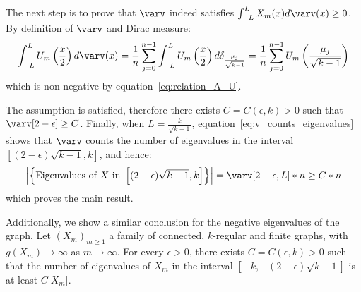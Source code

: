 \documentclass[11pt]{article}
\theoremstyle{definition}
\begin{document}
    The next step is to prove that $\varv$ indeed satisfies $\int_{-L}^{L} X_m(x) d \varv(x) \geq 0$.
    By definition of $\varv$ and Dirac measure:
    $$
    \int_{-L}^L U_m\left(\frac{x}{2}\right) d\varv(x) =
        \frac{1}{n} \sum_{j=0}^{n-1} \int_{-L}^L U_m\left(\frac{x}{2}\right) d \delta_{\frac{\mu_j}{\sqrt{k-1}}} =
        \frac{1}{n} \sum_{j=0}^{n-1} U_m\left( \frac{\mu_j}{\sqrt{k-1}} \right)
    $$
    which is non-negative by equation~\eqref{eq:relation_A_U}.
    \newline

    The assumption is satisfied, therefore there exists $C = C(\epsilon, k) > 0$ such that $\varv[2 - \epsilon] \geq C$.
    Finally, when $L = \frac{k}{\sqrt{k-1}}$, equation~\eqref{eq:v_counts_eigenvalues} shows that $\varv$ counts the
    number of eigenvalues in the interval $[(2 - \epsilon)\sqrt{k-1}, k]$, and hence:
    $$
    \left|\left\{ \text{Eigenvalues of } X \text{ in } \left[ (2 - \epsilon)\sqrt{k-1}, k \right] \right\}\right| =
        \varv[2 - \epsilon, L] * n \geq C * n
    $$
    which proves the main result.
    \newline

    Additionally, we show a similar conclusion for the negative eigenvalues of the graph.
    Let $\left( X_m \right)_{m\geq1}$ a family of connected, $k$-regular and finite graphs,
    with $g(X_m) \rightarrow \infty$ as $m \rightarrow \infty$.
    For every $\epsilon > 0$, there exists $C = C(\epsilon, k) > 0$ such that the number of eigenvalues of $X_m$ in the
    interval $[-k, -(2 - \epsilon)\sqrt{k-1}]$ is at least $C |X_m|$.
\end{document}
